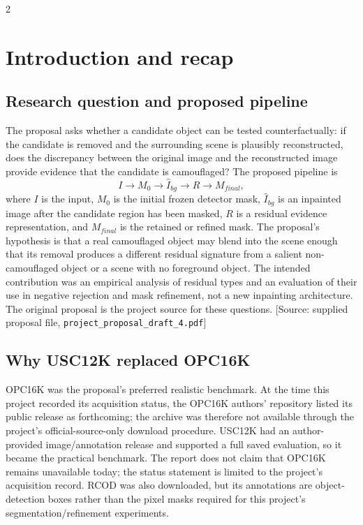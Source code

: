 \documentclass[10pt,a4paper]{article}
\begin{document}
\begingroup\small\setcounter{tocdepth}{1}
\begin{multicols}{2}\tableofcontents\end{multicols}\endgroup

\section{Introduction and recap}
\subsection{Research question and proposed pipeline}
The proposal asks whether a candidate object can be tested counterfactually: if the candidate is removed and the surrounding scene is plausibly reconstructed, does the discrepancy between the original image and the reconstructed image provide evidence that the candidate is camouflaged? The proposed pipeline is
\[
 I \longrightarrow M_0 \longrightarrow \hat I_{bg} \longrightarrow R \longrightarrow M_{final},
\]
where \(I\) is the input, \(M_0\) is the initial frozen detector mask, \(\hat I_{bg}\) is an inpainted image after the candidate region has been masked, \(R\) is a residual evidence representation, and \(M_{final}\) is the retained or refined mask. The proposal's hypothesis is that a real camouflaged object may blend into the scene enough that its removal produces a different residual signature from a salient non-camouflaged object or a scene with no foreground object. The intended contribution was an empirical analysis of residual types and an evaluation of their use in negative rejection and mask refinement, not a new inpainting architecture. The original proposal is the project source for these questions. [Source: supplied proposal file, \texttt{project\_proposal\_draft\_4.pdf}]

\subsection{Why USC12K replaced OPC16K}
OPC16K was the proposal's preferred realistic benchmark. At the time this project recorded its acquisition status, the OPC16K authors' repository listed its public release as forthcoming; the archive was therefore not available through the project's official-source-only download procedure. USC12K had an author-provided image/annotation release and supported a full saved evaluation, so it became the practical benchmark. The report does not claim that OPC16K remains unavailable today; the status statement is limited to the project's acquisition record. RCOD was also downloaded, but its annotations are object-detection boxes rather than the pixel masks required for this project's segmentation/refinement experiments. \citep{opc16k,usc12k,rcod}
\end{document}
